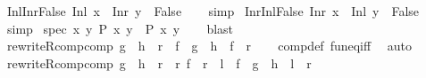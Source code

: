 \begin{isabellebody}
%
\isadelimproof
\isanewline
%
\endisadelimproof
\isanewline
{}\isamarkupfalse%
\ Inl{\isacharunderscore}{\kern0pt}Inr{\isacharunderscore}{\kern0pt}False{\isacharcolon}{\kern0pt}\ {\isachardoublequoteopen}{\isacharparenleft}{\kern0pt}Inl\ x\ {\isacharequal}{\kern0pt}\ Inr\ y{\isacharparenright}{\kern0pt}\ {\isacharequal}{\kern0pt}\ False{\isachardoublequoteclose}\isanewline
%
\isadelimproof
\ \ %
\endisadelimproof
%
\isatagproof
{}\isamarkupfalse%
\ simp%
\endisatagproof
{\isafoldproof}%
%
\isadelimproof
\isanewline
%
\endisadelimproof
\isanewline
{}\isamarkupfalse%
\ Inr{\isacharunderscore}{\kern0pt}Inl{\isacharunderscore}{\kern0pt}False{\isacharcolon}{\kern0pt}\ {\isachardoublequoteopen}{\isacharparenleft}{\kern0pt}Inr\ x\ {\isacharequal}{\kern0pt}\ Inl\ y{\isacharparenright}{\kern0pt}\ {\isacharequal}{\kern0pt}\ False{\isachardoublequoteclose}\isanewline
%
\isadelimproof
\ \ %
\endisadelimproof
%
\isatagproof
{}\isamarkupfalse%
\ simp%
\endisatagproof
{\isafoldproof}%
%
\isadelimproof
\isanewline
%
\endisadelimproof
\isanewline
{}\isamarkupfalse%
\ spec{}{\isacharcolon}{\kern0pt}\ {\isachardoublequoteopen}{\isasymforall}x\ y{\isachardot}{\kern0pt}\ P\ x\ y\ {\isasymLongrightarrow}\ P\ x\ y{\isachardoublequoteclose}\isanewline
%
\isadelimproof
\ \ %
\endisadelimproof
%
\isatagproof
{}\isamarkupfalse%
\ blast%
\endisatagproof
{\isafoldproof}%
%
\isadelimproof
\isanewline
%
\endisadelimproof
\isanewline
{}\isamarkupfalse%
\ rewriteR{\isacharunderscore}{\kern0pt}comp{\isacharunderscore}{\kern0pt}comp{\isacharcolon}{\kern0pt}\ {\isachardoublequoteopen}{\isasymlbrakk}g\ {\isasymcirc}\ h\ {\isacharequal}{\kern0pt}\ r{\isasymrbrakk}\ {\isasymLongrightarrow}\ f\ {\isasymcirc}\ g\ {\isasymcirc}\ h\ {\isacharequal}{\kern0pt}\ f\ {\isasymcirc}\ r{\isachardoublequoteclose}\isanewline
%
\isadelimproof
\ \ %
\endisadelimproof
%
\isatagproof
{}\isamarkupfalse%
\ comp{\isacharunderscore}{\kern0pt}def\ fun{\isacharunderscore}{\kern0pt}eq{\isacharunderscore}{\kern0pt}iff\ \isamarkupfalse%
\ auto%
\endisatagproof
{\isafoldproof}%
%
\isadelimproof
\isanewline
%
\endisadelimproof
\isanewline
{}\isamarkupfalse%
\ rewriteR{\isacharunderscore}{\kern0pt}comp{\isacharunderscore}{\kern0pt}comp{}{\isacharcolon}{\kern0pt}\ {\isachardoublequoteopen}{\isasymlbrakk}g\ {\isasymcirc}\ h\ {\isacharequal}{\kern0pt}\ r{}\ {\isasymcirc}\ r{}{\isacharsemicolon}{\kern0pt}\ f\ {\isasymcirc}\ r{}\ {\isacharequal}{\kern0pt}\ l{\isasymrbrakk}\ {\isasymLongrightarrow}\ f\ {\isasymcirc}\ g\ {\isasymcirc}\ h\ {\isacharequal}{\kern0pt}\ l\ {\isasymcirc}\ r{}{\isachardoublequoteclose}\isanewline

\end{isabellebody}
